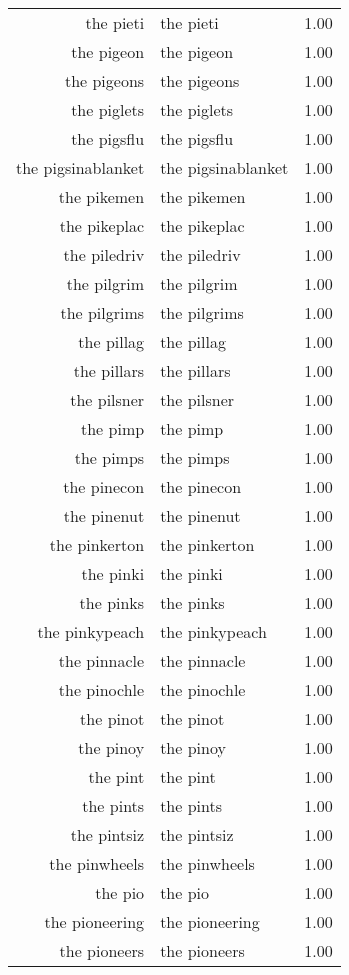 \begin{table}[ht]
\begin{tabular}{rlr}
  the pieti & the pieti & 1.00 \\ 
  the pigeon & the pigeon & 1.00 \\ 
  the pigeons & the pigeons & 1.00 \\ 
  the piglets & the piglets & 1.00 \\ 
  the pigsflu & the pigsflu & 1.00 \\ 
  the pigsinablanket & the pigsinablanket & 1.00 \\ 
  the pikemen & the pikemen & 1.00 \\ 
  the pikeplac & the pikeplac & 1.00 \\ 
  the piledriv & the piledriv & 1.00 \\ 
  the pilgrim & the pilgrim & 1.00 \\ 
  the pilgrims & the pilgrims & 1.00 \\ 
  the pillag & the pillag & 1.00 \\ 
  the pillars & the pillars & 1.00 \\ 
  the pilsner & the pilsner & 1.00 \\ 
  the pimp & the pimp & 1.00 \\ 
  the pimps & the pimps & 1.00 \\ 
  the pinecon & the pinecon & 1.00 \\ 
  the pinenut & the pinenut & 1.00 \\ 
  the pinkerton & the pinkerton & 1.00 \\ 
  the pinki & the pinki & 1.00 \\ 
  the pinks & the pinks & 1.00 \\ 
  the pinkypeach & the pinkypeach & 1.00 \\ 
  the pinnacle & the pinnacle & 1.00 \\ 
  the pinochle & the pinochle & 1.00 \\ 
  the pinot & the pinot & 1.00 \\ 
  the pinoy & the pinoy & 1.00 \\ 
  the pint & the pint & 1.00 \\ 
  the pints & the pints & 1.00 \\ 
  the pintsiz & the pintsiz & 1.00 \\ 
  the pinwheels & the pinwheels & 1.00 \\ 
  the pio & the pio & 1.00 \\ 
  the pioneering & the pioneering & 1.00 \\ 
  the pioneers & the pioneers & 1.00 \\ 

\end{tabular}
\end{table}
